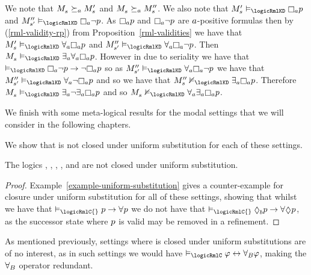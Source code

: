 \begin{example}
We note that $\kPModel{\kStateS} \simulatesA \kPModelP{\kStateS}$ and $\kPModel{\kStateS} \simulatesA \kPModelPP{\kStateS}$.
We also note that $\kPModelP{\kStateS} \entails_\logicRmlKD\necessaryA \atomP$ and $\kPModelPP{\kStateSP} \entails_\logicRmlKD\necessaryA \lnot \atomP$.
As $\necessaryA \atomP$ and $\necessaryA \lnot \atomP$ are $a$-positive formulas then by (\ref{rml-validity-rp}) from Proposition~\ref{rml-validities} we have that $\kPModelP{\kStateS} \entails_\logicRmlKD\allrefsA \necessaryA \atomP$ and $\kPModelPP{\kStateSP} \entails_\logicRmlKD\allrefsA \necessaryA \lnot \atomP$.
Then $\kPModel{\kStateS} \entails_\logicRmlKD\somerefsA \allrefsA \necessaryA \atomP$.
However in \classKD{} due to seriality we have that $\entails_\logicRmlKD\necessaryA \lnot \atomP \implies \lnot \necessaryA \atomP$ so as $\kPModelPP{\kStateSP} \entails_\logicRmlKD\allrefsA \necessaryA \lnot \atomP$ we have that $\kPModelPP{\kStateSP} \entails_\logicRmlKD\allrefsA \lnot \necessaryA \atomP$ and so we have that $\kPModelPP{\kStateS} \nentails_\logicRmlKD\somerefsA \necessaryA \atomP$.
Therefore $\kPModel{\kStateS} \entails_\logicRmlKD\somerefsA \lnot \somerefsA \necessaryA \atomP$ and so $\kPModel{\kStateS} \nentails_\logicRmlKD\allrefsA \somerefsA \necessaryA \atomP$.
\end{example}

We finish with some meta-logical results for the modal settings that we will consider in the following chapters.

We show that \logicRml{} is not closed under uniform substitution for each of these settings.

\begin{proposition}
The logics \logicRmlK{}, \logicRmlKF{}, \logicRmlKFF{}, \logicRmlKD{}, \logicRmlSF{} and \logicRmlS{} are not closed under uniform substitution.
\end{proposition}

\begin{proof}
Example~\ref{example-uniform-substitution} gives a counter-example for closure under uniform substitution for all of these settings, showing that whilst we have that $\entails_\logicRmlC{} \atomP \implies \allrefs \atomP$ we do not have that $\entails_\logicRmlC{} \possibleB \atomP \implies \allrefs \possible \atomP$, as the successor state where $p$ is valid may be removed in a refinement.
\end{proof}

As mentioned previously, settings where \logicRml{} is closed under uniform substitutions are of no interest, as in such settings we would have $\entails_\logicRmlC \phi \iff \allrefsBs \phi$, making the ${\forall_{B}}$ operator redundant.

